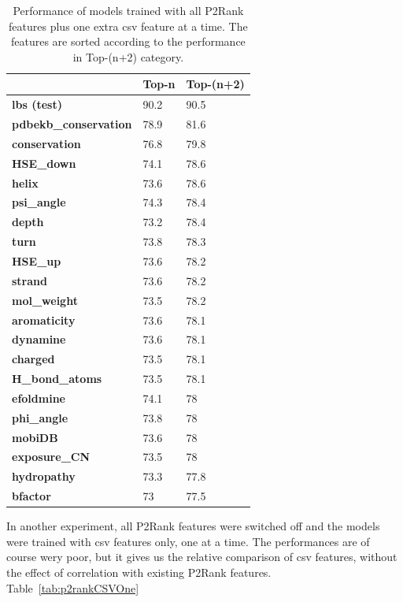 \begin{table}[]
\centering
\begin{tabular}{lll}
\hline
                              & Top-n & Top-(n+2) \\ \hline
\textbf{lbs (test)}                  & 90.2  & 90.5      \\
\textbf{pdbekb\_conservation} & 78.9  & 81.6      \\
\textbf{conservation}         & 76.8  & 79.8      \\
\textbf{HSE\_down}            & 74.1  & 78.6      \\
\textbf{helix}                & 73.6  & 78.6      \\
\textbf{psi\_angle}           & 74.3  & 78.4      \\
\textbf{depth}                & 73.2  & 78.4      \\
\textbf{turn}                 & 73.8  & 78.3      \\
\textbf{HSE\_up}              & 73.6  & 78.2      \\
\textbf{strand}               & 73.6  & 78.2      \\
\textbf{mol\_weight}          & 73.5  & 78.2      \\
\textbf{aromaticity}          & 73.6  & 78.1      \\
\textbf{dynamine}             & 73.6  & 78.1      \\
\textbf{charged}              & 73.5  & 78.1      \\
\textbf{H\_bond\_atoms}       & 73.5  & 78.1      \\
\textbf{efoldmine}            & 74.1  & 78        \\
\textbf{phi\_angle}           & 73.8  & 78        \\
\textbf{mobiDB}               & 73.6  & 78        \\
\textbf{exposure\_CN}         & 73.5  & 78        \\
\textbf{hydropathy}           & 73.3  & 77.8      \\
\textbf{bfactor}              & 73    & 77.5      \\ \hline
\end{tabular}
\caption{Performance of models trained with all P2Rank features plus one extra csv feature at a time. The features are sorted according to the performance in Top-(n+2) category.}
\label{tab:p2rankCSV}
\end{table}

In another experiment, all P2Rank features were switched off and the models were trained with csv features only, one at a time. The performances are of course wery poor, but it gives us the relative comparison of csv features, without the effect of correlation with existing P2Rank features. Table~\ref{tab:p2rankCSVOne}


